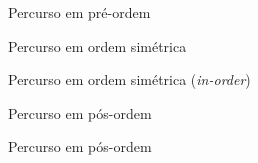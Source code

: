 \begin{frame}{Percurso em pré-ordem}


\end{frame}

\begin{frame}{Percurso em ordem simétrica}

\begin{center}
 \begin{tikzpicture}
  
\end{tikzpicture}
\end{center}

\end{frame}

\begin{frame}{Percurso em ordem simétrica ({\it in-order\/})}


 

\end{frame}

\begin{frame}{Percurso em pós-ordem}

\begin{center}
  \begin{tikzpicture}
    
  \end{tikzpicture}
\end{center}

\end{frame}

\begin{frame}{Percurso em pós-ordem}


 

\end{frame}


